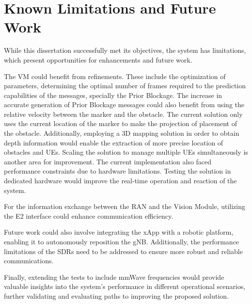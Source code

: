 \section{Known Limitations and Future Work}\label{sec:fut_work}
While this dissertation successfully met its objectives, the system has limitations, which present opportunities for enhancements and future work.

The VM could benefit from refinements.
These include the optimization of parameters, determining the optimal number of frames required to the prediction capabilities of the messages, specially the Prior Blockage.
The increase in accurate generation of Prior Blockage messages could also benefit from using the relative velocity between the marker and the obstacle.
The current solution only uses the current location of the marker to make the projection of placement of the obstacle.
Additionally, employing a 3D mapping solution in order to obtain depth information would enable the extraction of more precise location of obstacles and UEs.
Scaling the solution to manage multiple UEs simultaneously is another area for improvement.
The current implementation also faced performance constraints due to hardware limitations.
Testing the solution in dedicated hardware would improve the real-time operation and reaction of the system.

For the information exchange between the RAN and the Vision Module, utilizing the E2 interface could enhance communication efficiency.

Future work could also involve integrating the xApp with a robotic platform, enabling it to autonomously reposition the gNB\@.
Additionally, the performance limitations of the SDRs need to be addressed to ensure more robust and reliable communications.

Finally, extending the tests to include mmWave frequencies would provide valuable insights into the system's performance in different operational scenarios, further validating and evaluating paths to improving the proposed solution.





    


